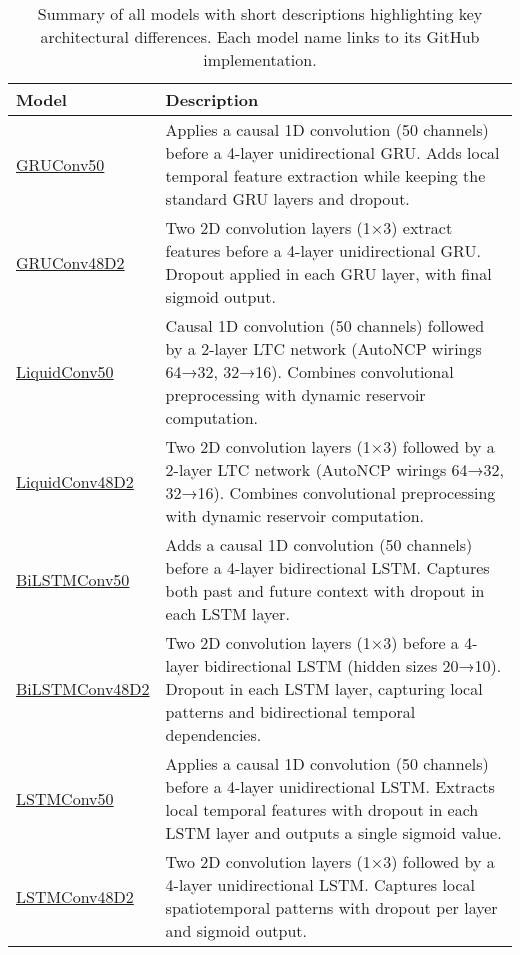 \begin{table}[h!]
\centering
\renewcommand{\arraystretch}{1.5}
\begin{tabular}{lp{10cm}}
\toprule
\textbf{Model} & \textbf{Description} \\
\midrule
\href{https://github.com/As17-01/brain_signals/blob/main/src/models/GRUConv50.py}{GRUConv50} & Applies a causal 1D convolution (50 channels) before a 4-layer unidirectional GRU. Adds local temporal feature extraction while keeping the standard GRU layers and dropout. \\

\href{https://github.com/As17-01/brain_signals/blob/main/src/models/GRUConv48D2.py}{GRUConv48D2} & Two 2D convolution layers (1×3) extract features before a 4-layer unidirectional GRU. Dropout applied in each GRU layer, with final sigmoid output. \\

\href{https://github.com/As17-01/brain_signals/blob/main/src/models/LiquidConv50.py}{LiquidConv50} & Causal 1D convolution (50 channels) followed by a 2-layer LTC network (AutoNCP wirings 64→32, 32→16). Combines convolutional preprocessing with dynamic reservoir computation. \\

\href{https://github.com/As17-01/brain_signals/blob/main/src/models/LiquidConv48D2.py}{LiquidConv48D2} & Two 2D convolution layers (1×3) followed by a 2-layer LTC network (AutoNCP wirings 64→32, 32→16). Combines convolutional preprocessing with dynamic reservoir computation. \\

\href{https://github.com/As17-01/brain_signals/blob/main/src/models/BiLSTMConv50.py}{BiLSTMConv50} & Adds a causal 1D convolution (50 channels) before a 4-layer bidirectional LSTM. Captures both past and future context with dropout in each LSTM layer. \\

\href{https://github.com/As17-01/brain_signals/blob/main/src/models/BiLSTMConv48D2.py}{BiLSTMConv48D2} & Two 2D convolution layers (1×3) before a 4-layer bidirectional LSTM (hidden sizes 20→10). Dropout in each LSTM layer, capturing local patterns and bidirectional temporal dependencies. \\

\href{https://github.com/As17-01/brain_signals/blob/main/src/models/LSTMConv50.py}{LSTMConv50} & Applies a causal 1D convolution (50 channels) before a 4-layer unidirectional LSTM. Extracts local temporal features with dropout in each LSTM layer and outputs a single sigmoid value. \\

\href{https://github.com/As17-01/brain_signals/blob/main/src/models/LSTMConv48D2.py}{LSTMConv48D2} & Two 2D convolution layers (1×3) followed by a 4-layer unidirectional LSTM. Captures local spatiotemporal patterns with dropout per layer and sigmoid output. \\

\bottomrule
\end{tabular}
\caption{Summary of all models with short descriptions highlighting key architectural differences. Each model name links to its GitHub implementation.}
\label{tab:model_descriptions}
\end{table}
